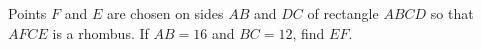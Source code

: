 Points $F$ and $E$ are chosen on sides $AB$ and $DC$ of rectangle $ABCD$ so that $AFCE$ is a rhombus. If $AB=16$ and $BC=12$, find $EF$.
